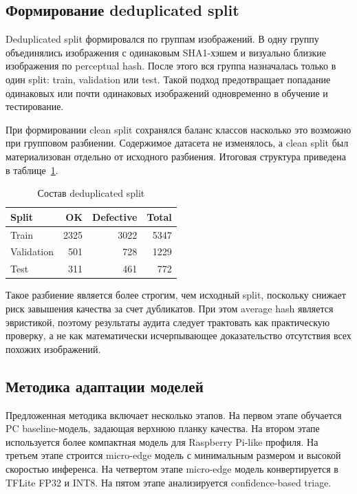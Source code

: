 \documentclass[12pt,a4paper]{article}
\begin{document}
\subsection{Формирование deduplicated split}

Deduplicated split формировался по группам изображений. В одну группу объединялись изображения с одинаковым SHA1-хэшем и визуально близкие изображения по perceptual hash. После этого вся группа назначалась только в один split: train, validation или test. Такой подход предотвращает попадание одинаковых или почти одинаковых изображений одновременно в обучение и тестирование.

При формировании clean split сохранялся баланс классов насколько это возможно при групповом разбиении. Содержимое датасета не изменялось, а clean split был материализован отдельно от исходного разбиения. Итоговая структура приведена в таблице~\ref{tab:split}.

\begin{table}[H]
\centering
\caption{Состав deduplicated split}
\label{tab:split}
\begin{tabular}{lrrr}
\toprule
Split & OK & Defective & Total \\
\midrule
Train & 2325 & 3022 & 5347 \\
Validation & 501 & 728 & 1229 \\
Test & 311 & 461 & 772 \\
\bottomrule
\end{tabular}
\end{table}

Такое разбиение является более строгим, чем исходный split, поскольку снижает риск завышения качества за счет дубликатов. При этом average hash является эвристикой, поэтому результаты аудита следует трактовать как практическую проверку, а не как математически исчерпывающее доказательство отсутствия всех похожих изображений.

\subsection{Методика адаптации моделей}

Предложенная методика включает несколько этапов. На первом этапе обучается PC baseline-модель, задающая верхнюю планку качества. На втором этапе используется более компактная модель для Raspberry Pi-like профиля. На третьем этапе строится micro-edge модель с минимальным размером и высокой скоростью инференса. На четвертом этапе micro-edge модель конвертируется в TFLite FP32 и INT8. На пятом этапе анализируется confidence-based triage.
\end{document}
